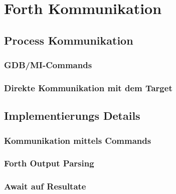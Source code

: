 \chapter{Forth Kommunikation}

\section{Process Kommunikation}

\subsection{GDB/MI-Commands}

\subsection{Direkte Kommunikation mit dem Target}

\section{Implementierungs Details}

\subsection{Kommunikation mittels Commands}

\subsection{Forth Output Parsing}

\subsection{Await auf Resultate}

